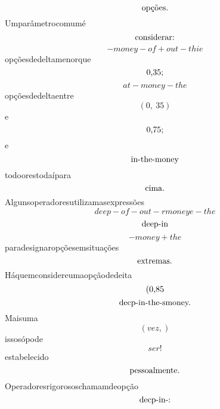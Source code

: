 \documentclass{article}
\begin{document}
\begin{equation}
$opções.$
\end{equation}Umparâmetrocomumé\begin{equation}
$considerar:$
\end{equation}\begin{equation}
- money - of + out - thie
\end{equation}opçõesdedeltamenorque\begin{equation}
$0,35;$
\end{equation}\begin{equation}
at - money - the
\end{equation}opçõesdedeltaentre\begin{equation}
\left( 0, \  35\right)
\end{equation}e\begin{equation}
$0,75;$
\end{equation}e\begin{equation}
$in-the-money$
\end{equation}todoorestodaípara\begin{equation}
$cima.$
\end{equation}Algunsoperadoresutilizamasexpressões\begin{equation}
deep - of - out - rmoneye - the
\end{equation}\begin{equation}
$deep-in$
\end{equation}\begin{equation}
- money + the
\end{equation}paradesignaropçõesemsituações\begin{equation}
$extremas.$
\end{equation}Háquemconsidereumaopçãodedeita\begin{equation}
$(0,85$
\end{equation}\begin{equation}
$decp-in-the-smoney.$
\end{equation}Maisuma\begin{equation}
\left( vez,\right)
\end{equation}issosópode\begin{equation}
ser!
\end{equation}estabelecido\begin{equation}
$pessoalmente.$
\end{equation}Operadoresrigorososchamamdeopção\begin{equation}
$decp-in-:$
\end{equation}\begin{equation}

\end{equation}
\end{document}
